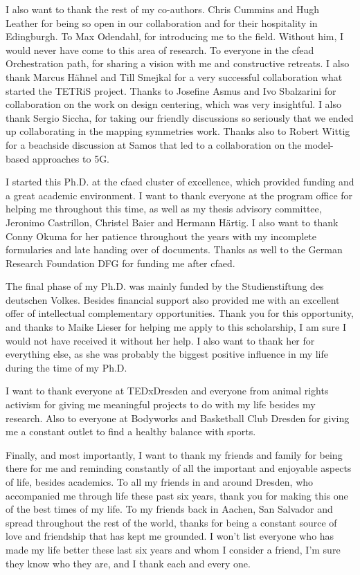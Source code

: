 I also want to thank the rest of my co-authors. Chris Cummins and Hugh Leather for being so open in our collaboration and for their hospitality in Edingburgh. 
To Max Odendahl, for introducing me to the field. Without him, I would never have come to this area of research.
To everyone in the cfead Orchestration path, for sharing a vision with me and constructive retreats.
I also thank Marcus Hähnel and Till Smejkal for a very successful collaboration what started the \acs*{TETRiS} project.
Thanks to Josefine Asmus and Ivo Sbalzarini for collaboration on the work on design centering, which was very insightful.
I also thank Sergio Siccha, for taking our friendly discussions so seriously that we ended up collaborating in the mapping symmetries work.
Thanks also to Robert Wittig for a beachside discussion at Samos that led to a collaboration on the model-based approaches to 5G.

I started this Ph.D. at the \ac{cfaed} cluster of excellence, which provided funding and a great academic environment.
I want to thank everyone at the program office for helping me throughout this time, as well as my thesis advisory committee, Jeronimo Castrillon, Christel Baier and Hermann Härtig.
I also want to thank Conny Okuma for her patience throughout the years with my incomplete formularies and late handing over of documents.
Thanks as well to the German Research Foundation DFG for funding me after \ac{cfaed}.

The final phase of my Ph.D. was mainly funded by the Studienstiftung des deutschen Volkes.
Besides financial support also provided me with an excellent offer of intellectual complementary opportunities.
Thank you for this opportunity, and thanks to Maike Lieser for helping me apply to this scholarship, I am sure I would not have received it without her help.
I also want to thank her for everything else, as she was probably the biggest positive influence in my life during the time of my Ph.D.

I want to thank everyone at TEDxDresden and everyone from animal rights activism for giving me meaningful projects to do with my life besides my research. 
Also to everyone at Bodyworks and Basketball Club Dresden for giving me a constant outlet to find a healthy balance with sports.

Finally, and most importantly, I want to thank my friends and family for being there for me and reminding constantly of all the important and enjoyable aspects of life, besides academics.
To all my friends in and around Dresden, who accompanied me through life these past six years, thank you for making this one of the best times of my life. 
To my friends back in Aachen, San Salvador and spread throughout the rest of the world, thanks for being a constant source of love and friendship that has kept me grounded.
I won't list everyone who has made my life better these last six years and whom I consider a friend, I'm sure they know who they are, and I thank each and every one.

